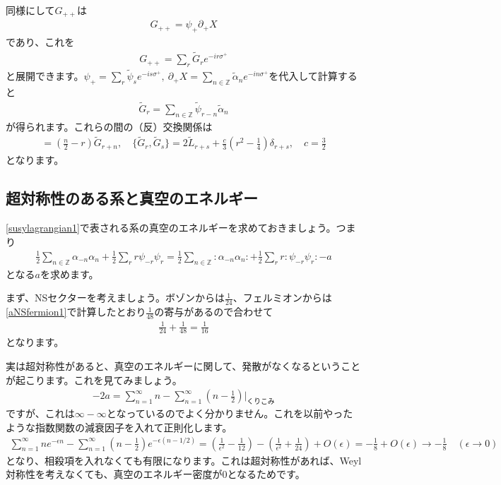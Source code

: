 \documentclass[report,paper=a4, fontsize=12pt, line_length=16cm, number_of_lines=34,dvipdfmx]{jlreq}
\numberwithin{equation}{chapter}
\numberwithin{equation}{section}
\newcommand{\Zb}{\mathbb{Z}}
\newcommand{\del}{\partial}
\newcommand{\alphat}{\tilde{\alpha}}
\newcommand{\Lt}{\widetilde{L}}
\newcommand{\Gt}{\widetilde{G}}
\newcommand{\psit}{\tilde{\psi}}
\begin{document}
同様にして$G_{++}$は
\begin{align}
  G_{++}=\psi_{+}\del_{+}X
\end{align}
であり、これを
\begin{align}
  G_{++}=\sum_{r}\Gt_{r}e^{-ir\sigma^{+}}
\end{align}
と展開できます。$\psi_{+}=\sum_{r}\psit_{s}e^{-is\sigma^{+}},\ \del_{+}X=\sum_{n\in\Zb}\alphat_{n}e^{-in\sigma^{+}}$を代入して計算すると
\begin{align}
  \Gt_{r}=\sum_{n\in\Zb}\psit_{r-n}\alphat_{n}
\end{align}
が得られます。これらの間の（反）交換関係は
\begin{align}
  [\Lt_n,\Gt_r]=\left( \frac{n}{2} -r\right)\Gt_{r+n},\quad
  \{\Gt_r,\Gt_s\}=2\Lt_{r+s}+\frac{c}{3}\left( r^2-\frac{1}{4} \right)\delta_{r+s},\quad
  c=\frac{3}{2}
\end{align}
となります。

\subsection{超対称性のある系と真空のエネルギー}

\eqref{susylagrangian1}で表される系の真空のエネルギーを求めておきましょう。つまり
\begin{align}
  \frac12 \sum_{n\in \Zb}\alpha_{-n}\alpha_{n}+\frac12 \sum_{r}r \psi_{-r}\psi_{r}
  =  \frac12 \sum_{n\in \Zb}:\alpha_{-n}\alpha_{n}:+\frac12 \sum_{r}r :\psi_{-r}\psi_{r}:-a
\end{align}
となる$a$を求めます。

まず、NSセクターを考えましょう。ボゾンからは$\frac{1}{24}$、フェルミオンからは\eqref{aNSfermion1}で計算したとおり$\frac{1}{48}$の寄与があるので合わせて
\begin{align}
  \frac{1}{24}+\frac{1}{48}=\frac{1}{16}\label{supervacuumenergyNS}
\end{align}
となります。

実は超対称性があると、真空のエネルギーに関して、発散がなくなるということが起こります。これを見てみましょう。
\begin{align}
  -2a=\sum_{n=1}^{\infty}n-\sum_{n=1}^{\infty}\left( n-\frac12 \right)　\Bigg|_{\text{くりこみ}}
\end{align}
ですが、これは$\infty-\infty$となっているのでよく分かりません。これを以前やったような指数関数の減衰因子を入れて正則化します。
\begin{align}
  \sum_{n=1}^{\infty}n e^{-\epsilon n}-\sum_{n=1}^{\infty}\left( n-\frac12 \right)e^{-\epsilon (n-1/2)}
  =\left( \frac{1}{\epsilon^2}-\frac{1}{12} \right)-\left( \frac{1}{\epsilon^2}+\frac{1}{24} \right)+O(\epsilon)
  =-\frac{1}{8}+O(\epsilon)\to -\frac{1}{8}\quad (\epsilon\to 0)
\end{align}
となり、相殺項を入れなくても有限になります。これは超対称性があれば、Weyl対称性を考えなくても、真空のエネルギー密度が$0$となるためです。
\end{document}
